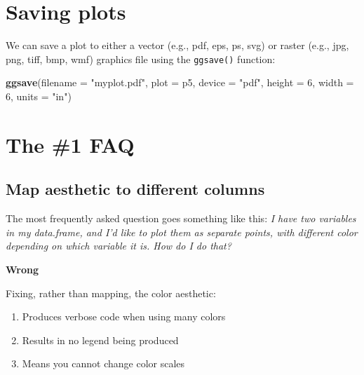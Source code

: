 \documentclass[]{book}
\newenvironment{Shaded}{\begin{snugshade}}{\end{snugshade}}
\newcommand{\DataTypeTok}[1]{\textcolor[rgb]{0.13,0.29,0.53}{#1}}
\newcommand{\DecValTok}[1]{\textcolor[rgb]{0.00,0.00,0.81}{#1}}
\newcommand{\KeywordTok}[1]{\textcolor[rgb]{0.13,0.29,0.53}{\textbf{#1}}}
\newcommand{\NormalTok}[1]{#1}
\newcommand{\StringTok}[1]{\textcolor[rgb]{0.31,0.60,0.02}{#1}}
\providecommand{\tightlist}{%
  \setlength{\itemsep}{0pt}\setlength{\parskip}{0pt}}
\begin{document}
\hypertarget{saving-plots}{%
\section{Saving plots}\label{saving-plots}}

We can save a plot to either a vector (e.g., pdf, eps, ps, svg)
or raster (e.g., jpg, png, tiff, bmp, wmf) graphics file using
the \texttt{ggsave()} function:

\begin{Shaded}
\begin{Highlighting}[]
\KeywordTok{ggsave}\NormalTok{(}\DataTypeTok{filename =} \StringTok{"myplot.pdf"}\NormalTok{, }\DataTypeTok{plot =}\NormalTok{ p5, }\DataTypeTok{device =} \StringTok{"pdf"}\NormalTok{, }\DataTypeTok{height =} \DecValTok{6}\NormalTok{, }\DataTypeTok{width =} \DecValTok{6}\NormalTok{, }\DataTypeTok{units =} \StringTok{"in"}\NormalTok{)}
\end{Highlighting}
\end{Shaded}

\hypertarget{the-1-faq}{%
\section{The \#1 FAQ}\label{the-1-faq}}

\hypertarget{map-aesthetic-to-different-columns}{%
\subsection{Map aesthetic to different columns}\label{map-aesthetic-to-different-columns}}

The most frequently asked question goes something like this: \emph{I have two variables in my data.frame, and I'd like to plot them as separate points, with different color depending on which variable it is. How do I do that?}

\textbf{Wrong}

Fixing, rather than mapping, the color aesthetic:

\begin{enumerate}
\def\labelenumi{\arabic{enumi}.}
\tightlist
\item
  Produces verbose code when using many colors
\item
  Results in no legend being produced
\item
  Means you cannot change color scales
\end{enumerate}
\end{document}

